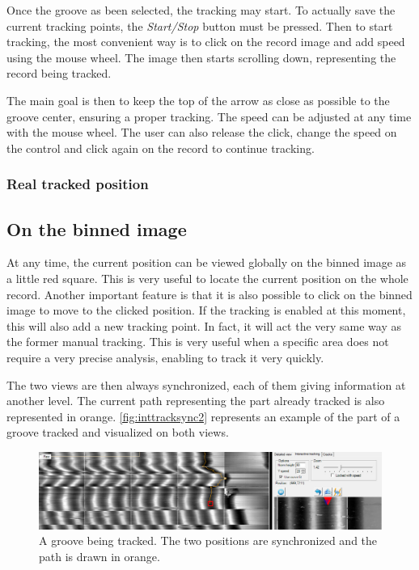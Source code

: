Once the groove as been selected, the tracking may start. To actually save the current tracking points, the \emph{Start/Stop} button must be pressed. Then to start tracking, the most convenient way is to click on the record image and add speed using the mouse wheel. The image then starts scrolling down, representing the record being tracked.

The main goal is then to keep the top of the arrow as close as possible to the groove center, ensuring a proper tracking. The speed can be adjusted at any time with the mouse wheel. The user can also release the click, change the speed on the control and click again on the record to continue tracking.

\subsubsection{Real tracked position}

\subsection{On the binned image}

At any time, the current position can be viewed globally on the binned image as a little red square. This is very useful to locate the current position on the whole record. Another important feature is that it is also possible to click on the binned image to move to the clicked position. If the tracking is enabled at this moment, this will also add a new tracking point. In fact, it will act the very same way as the former manual tracking. This is very useful when a specific area does not require a very precise analysis, enabling to track it very quickly.

The two views are then always synchronized, each of them giving information at another level. The current path representing the part already tracked is also represented in orange. \autoref{fig:inttracksync2} represents an example of the part of a groove tracked and visualized on both views.

\begin{figure}[!ht]
\centering
\includegraphics[width=1.0\textwidth]{images/int-track-sync-2}
\caption[A groove being tracked.]
{A groove being tracked. The two positions are synchronized and the path is drawn in orange.}
\label{fig:inttracksync2}
\end{figure}

